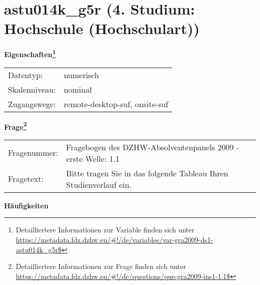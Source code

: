 
    \setcounter{footnote}{0}

    \vspace*{-1.8cm}
	\section{astu014k\_g5r (4. Studium: Hochschule (Hochschulart))}
	\label{section:astu014k_g5r}



    \vspace*{0.5cm}
    \noindent\textbf{Eigenschaften\footnote{Detailliertere Informationen zur Variable finden sich unter
		\url{https://metadata.fdz.dzhw.eu/\#!/de/variables/var-gra2009-ds1-astu014k_g5r$}}}\\
	\begin{tabularx}{\hsize}{@{}lX}
	Datentyp: & numerisch \\
	Skalenniveau: & nominal \\
	Zugangswege: &
	  remote-desktop-suf, 
	  onsite-suf
 \\
    \end{tabularx}



				\vspace*{0.5cm}
                \noindent\textbf{Frage\footnote{Detailliertere Informationen zur Frage finden sich unter
		              \url{https://metadata.fdz.dzhw.eu/\#!/de/questions/que-gra2009-ins1-1.1$}}}\\
				\begin{tabularx}{\hsize}{@{}lX}
					Fragenummer: &
					  Fragebogen des DZHW-Absolventenpanels 2009 - erste Welle:
					  1.1
 \\
					Fragetext: & Bitte tragen Sie in das folgende Tableau Ihren Studienverlauf ein. \\
				\end{tabularx}





        		\vspace*{0.5cm}
                \noindent\textbf{Häufigkeiten}

